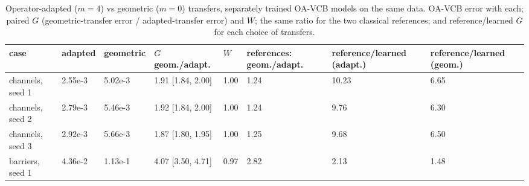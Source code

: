 \begin{table}[tbp]\centering\footnotesize\setlength{\tabcolsep}{4pt}
\caption{Operator-adapted ($m=4$) vs geometric ($m=0$) transfers, separately trained OA-VCB models on the same data. OA-VCB error with each; paired $G$ (geometric-transfer error / adapted-transfer error) and $W$; the same ratio for the two classical references; and reference/learned $G$ for each choice of transfers.}\label{tab:transfers}
\begin{adjustbox}{max width=\linewidth}
\begin{tabular}{llllllll}\toprule
case & adapted & geometric & $G$ geom./adapt. & $W$ & references: geom./adapt. & reference/learned (adapt.) & reference/learned (geom.) \\\midrule
channels, seed 1 & 2.55e-3 & 5.02e-3 & 1.91 [1.84, 2.00] & 1.00 & 1.24 & 10.23 & 6.65 \\
channels, seed 2 & 2.79e-3 & 5.46e-3 & 1.92 [1.84, 2.00] & 1.00 & 1.24 & 9.76 & 6.30 \\
channels, seed 3 & 2.92e-3 & 5.66e-3 & 1.87 [1.80, 1.95] & 1.00 & 1.25 & 9.68 & 6.50 \\
barriers, seed 1 & 4.36e-2 & 1.13e-1 & 4.07 [3.50, 4.71] & 0.97 & 2.82 & 2.13 & 1.48 \\
\bottomrule\end{tabular}
\end{adjustbox}
\end{table}
